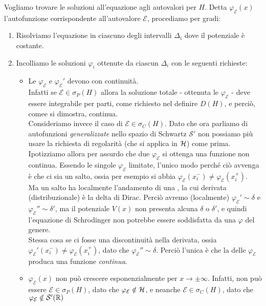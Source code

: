 \documentclass[../../FisicaTeorica.tex]{subfiles}
\begin{document}
Vogliamo trovare le soluzioni all'equazione agli autovalori per $H$. Detta  $\varphi_{\mathcal{E}}(x)$ l'autofunzione corrispondente all'autovalore $\mathcal{E}$, procediamo per gradi:
\begin{enumerate}
\item Risolviamo l'equazione in ciascuno degli intervalli $\Delta_i$ dove il potenziale è costante.
\item Incolliamo le soluzioni $\varphi_i$ ottenute da ciascun $\Delta_i$ con le seguenti richieste:
\begin{itemize}
\item Le $\varphi_\mathcal{E}$ e $\varphi_{\mathcal{E}}'$ devono  con continuità.\\ Infatti se $\mathcal{E}\in \sigma_P(H)$ allora la soluzione totale - ottenuta  le $\varphi_\mathcal{E}$ - deve essere 
integrabile per parti, come richiesto nel definire $D(H)$, e perciò, comee si dimostra, continua.\\
Consideriamo invece il caso di $\mathcal{E}\in \sigma_C(H)$. Dato che ora parliamo di autofunzioni \textit{generalizzate} nello spazio di Schwartz $\mathcal{S}'$ non possiamo più usare la richiesta di regolarità (che si applica in $\mathcal{H}$) come prima. Ipotizziamo allora per assurdo che  due $\varphi_\mathcal{E}$ si ottenga una funzione non continua. Essendo le singole $\varphi_\mathcal{E}$ limitate, l'unico modo perché ciò avvenga è che ci sia un salto, ossia per esempio si abbia $\varphi_{\mathcal{E}}(x_i^-)\neq \varphi_{\mathcal{E}}(x_i^+)$.\\
Ma un salto ha localmente l'andamento di una , la cui derivata (distribuzionale) è la delta di Dirac. Perciò avremo (localmente) $\varphi_{\mathcal{E}}'\sim \delta$ e $\varphi_{\mathcal{E}}''\sim \delta'$, ma il potenziale $V(x)$ non presenta alcuna $\delta$ o $\delta'$, e quindi l'equazione di Schrodinger non potrebbe essere soddisfatta da una $\varphi$ del genere.\\
Stessa cosa se ci fosse una discontinuità nella derivata, ossia $\varphi_\mathcal{E}'(x_i^-)\neq \varphi_\mathcal{E}(x_i^+)$, dato che $\varphi_{\mathcal{E}}''\sim\delta$. Perciò l'unica è che la  delle $\varphi_\mathcal{E}$ produca una funzione \textit{continua}.
\item $\varphi_{\mathcal{E}}(x)$ non può crescere esponenzialmente per $x\to\pm \infty$. Infatti, non può essere $\mathcal{E}\in \sigma_P(H)$, dato che $\varphi_{\mathcal{E}}\notin \mathcal{H}$, e neanche $\mathcal{E}\in \sigma_C(H)$, dato che $\varphi_\mathcal{E}\notin \mathcal{S}'(\mathbb{R})$
\end{itemize} 
\end{enumerate}
\end{document}
